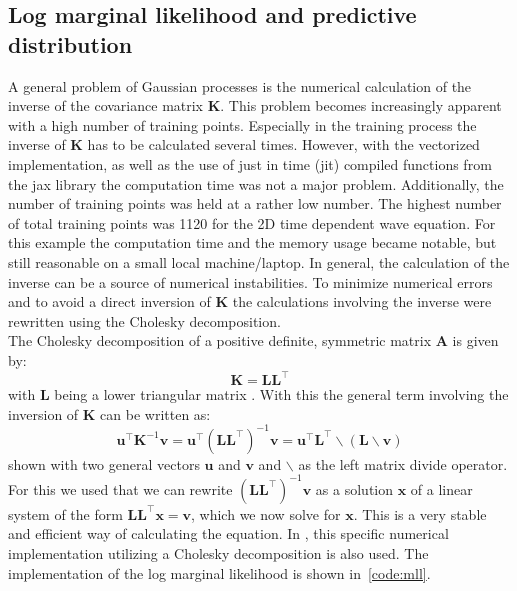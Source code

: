 \documentclass{article}
\begin{document}
\subsection{Log marginal likelihood and predictive distribution}
A general problem of Gaussian processes is the numerical calculation of the inverse of the covariance matrix $\bm{K}$. This problem becomes increasingly apparent with a high number of training points. Especially in the training process the inverse of $\bm{K}$ has to be calculated several times. However, with the vectorized implementation, as well as the use of just in time (jit) compiled functions from the jax library the computation time was not a major problem. Additionally, the number of training points was held at a rather low number. The highest number of total training points was 1120 for the 2D time dependent wave equation. For this example the computation time and the memory usage became notable, but still reasonable on a small local machine/laptop. In general, the calculation of the inverse can be a source of numerical instabilities. To minimize numerical errors and to avoid a direct inversion of $\bm{K}$ the calculations involving the inverse were rewritten using the Cholesky decomposition. \\
The Cholesky decomposition of a positive definite, symmetric matrix $\bm{A}$ is given by:
\begin{equation}
    \bm{K} = \bm{L}\bm{L}^\intercal
\end{equation}
with $\bm{L}$ being a lower triangular matrix \cite{RasmussenCarlEdward}. With this the general term involving the inversion of $\bm{K}$ can be written as:
\begin{equation}
    \label{eq:inv_K}
    \bm{u}^\intercal \bm{K}^{-1}\bm{v} = \bm{u}^\intercal (\bm{LL^{\intercal}})^{-1} \bm{v} = \bm{u}^\intercal \bm{L^{\intercal} \backslash (L\backslash v)}
\end{equation}
shown with two general vectors $\bm{u}$ and $\bm{v}$ and $\backslash$ as the left matrix divide operator. For this we used that we can rewrite $(\bm{LL^{\intercal}})^{-1} \bm{v}$ as a solution $\bm{x}$ of a linear system of the form $\bm{LL^{\intercal}} \bm{x}=\bm{v}$, which we now solve for $\bm{x}$. This is a very stable and efficient way of calculating the equation. In \cite{RasmussenCarlEdward}, this specific numerical implementation utilizing a Cholesky decomposition is also used. The implementation of the log marginal likelihood is shown in~\ref{code:mll}.\\

\end{document}
